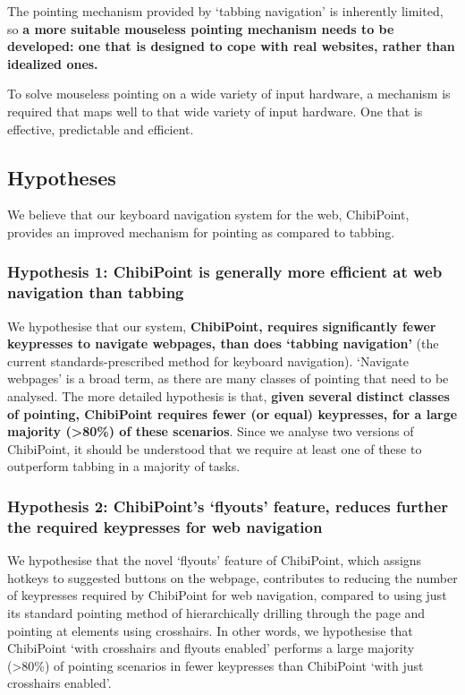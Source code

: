 \documentclass[a4paper, 12pt]{report}
\begin{document}
The pointing mechanism provided by `tabbing navigation' is inherently limited, so \textbf{a more suitable mouseless pointing mechanism needs to be developed: one that is designed to cope with real websites, rather than idealized ones.}

To solve mouseless pointing on a wide variety of input hardware, a mechanism is required that maps well to that wide variety of input hardware. One that is effective, predictable and efficient.

\subsection{Hypotheses}
\label{chap:hypotheses}
We believe that our keyboard navigation system for the web, ChibiPoint, provides an improved mechanism for pointing as compared to tabbing.

\newcommand{\hypone}{Hypothesis 1: ChibiPoint is generally more efficient at web navigation than tabbing}
\subsubsection{\hypone}
We hypothesise that our system, \textbf{ChibiPoint, requires significantly fewer keypresses to navigate webpages, than does `tabbing navigation'} (the current standards-prescribed method for keyboard navigation).
`Navigate webpages' is a broad term, as there are many classes of pointing that need to be analysed. The more detailed hypothesis is that, \textbf{given several distinct classes of pointing, ChibiPoint requires fewer (or equal) keypresses, for a large majority (>80\%) of these scenarios}. Since we analyse two versions of ChibiPoint, it should be understood that we require at least one of these to outperform tabbing in a majority of tasks.

\newcommand{\hyptwo}{Hypothesis 2: ChibiPoint's `flyouts' feature, reduces further the required keypresses for web navigation}
\subsubsection{\hyptwo}
We hypothesise that the novel `flyouts' feature of ChibiPoint, which assigns hotkeys to suggested buttons on the webpage, contributes to reducing the number of keypresses required by ChibiPoint for web navigation, compared to using just its standard pointing method of hierarchically drilling through the page and pointing at elements using crosshairs.
In other words, we hypothesise that ChibiPoint `with crosshairs and flyouts enabled' performs a large majority (>80\%) of pointing scenarios in fewer keypresses than ChibiPoint `with just crosshairs enabled'.
\end{document}
